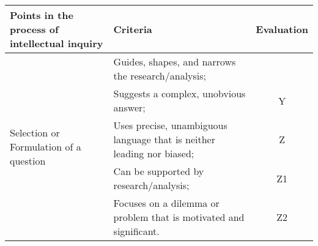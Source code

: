\documentclass{article}\usepackage[]{graphicx}\usepackage[]{color}
\begin{document}
\begin{table}
\begin{tabular}{p{4cm}p{6cm}c} \hline
Points in the process of intellectual inquiry   & Criteria & Evaluation \\ \hline\hline
    \multirow{5}{*}{Selection or Formulation of a question}   
    & Guides, shapes, and narrows the research/analysis; 
            &  \\
    & Suggests a complex, unobvious answer; 
            & Y\\
    & Uses precise, unambiguous language that is neither leading nor biased;
            & Z \\
    & Can be supported by research/analysis;
            & Z1 \\
    & Focuses on a dilemma or problem that is motivated and significant.
            & Z2 \\

\hline
\end{tabular}
\end{table}
\end{document}

